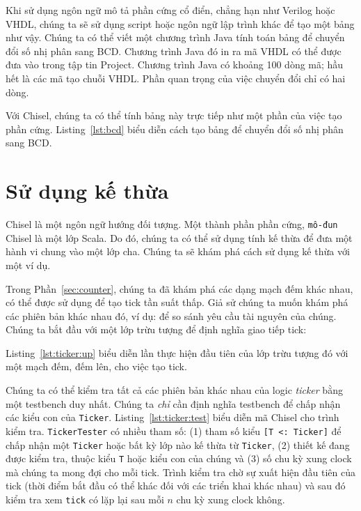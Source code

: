 \documentclass[%
    10pt,
    headinclude, footexclude,
    openright, %
    notitlepage,
    cleardoubleempty,
    headsepline,
    pointlessnumbers,
    bibtotoc, idxtotoc,
    ]{scrbook}
\newcommand{\code}[1]{{\small{\texttt{#1}}}}
\begin{document}
Khi sử dụng ngôn ngữ mô tả phần cứng cổ điển, chẳng hạn như Verilog hoặc VHDL, chúng ta sẽ sử dụng script hoặc ngôn ngữ lập trình khác để tạo một bảng như vậy. Chúng ta có thể viết một chương trình Java tính toán bảng để chuyển đổi số nhị phân sang BCD. Chương trình Java đó in ra mã VHDL có thể được đưa vào trong tập tin Project. Chương trình Java có khoảng 100 dòng mã; hầu hết là các mã tạo chuỗi VHDL. Phần quan trọng của việc chuyển đổi chỉ có hai dòng.

Với Chisel, chúng ta có thể tính bảng này trực tiếp như một phần của việc tạo phần cứng. Listing~\ref{lst:bcd} biểu diễn cách tạo bảng để chuyển đổi số nhị phân sang BCD. 


\section{Sử dụng kế thừa}
\label{sec:inheritance}


Chisel là một ngôn ngữ hướng đối tượng. Một thành phần phần cứng, \code{mô-đun} Chisel là một lớp Scala. Do đó, chúng ta có thể sử dụng tính kế thừa để đưa một hành vi chung vào một lớp cha. Chúng ta sẽ khám phá cách sử dụng kế thừa với một ví dụ.

Trong Phần~\ref{sec:counter}, chúng ta đã khám phá các dạng mạch đếm khác nhau, có thể được sử dụng để tạo tick tần suất thấp. Giả sử chúng ta muốn khám phá các phiên bản khác nhau đó, ví dụ: để so sánh yêu cầu tài nguyên của chúng. Chúng ta bắt đầu với một lớp trừu tượng để định nghĩa giao tiếp tick: 


\noindent Listing~\ref{lst:ticker:up} biểu diễn lần thực hiện đầu tiên của lớp trừu tượng đó với một mạch đếm, đếm lên, cho việc tạo tick. 


Chúng ta có thể kiểm tra tất cả các phiên bản khác nhau của logic \emph{ticker} bằng một testbench duy nhất. Chúng ta \emph{chỉ} cần định nghĩa testbench để chấp nhận các kiểu con của \code{Ticker}. Listing~\ref{lst:ticker:test} biểu diễn mã Chisel cho trình kiểm tra. \code{TickerTester} có nhiều tham số: (1) tham số kiểu \code{[T <: Ticker]} để chấp nhận một \code{Ticker} hoặc bất kỳ lớp nào kế thừa từ \code{Ticker}, (2) thiết kế đang được kiểm tra, thuộc kiểu \code{T} hoặc kiểu con của chúng và (3) số chu kỳ xung clock mà chúng ta mong đợi cho mỗi tick. Trình kiểm tra chờ sự xuất hiện đầu tiên của tick (thời điểm bắt đầu có thể khác đối với các triển khai khác nhau) và sau đó kiểm tra xem \code{tick} có lặp lại sau mỗi $n$ chu kỳ xung clock không. 
\end{document}
